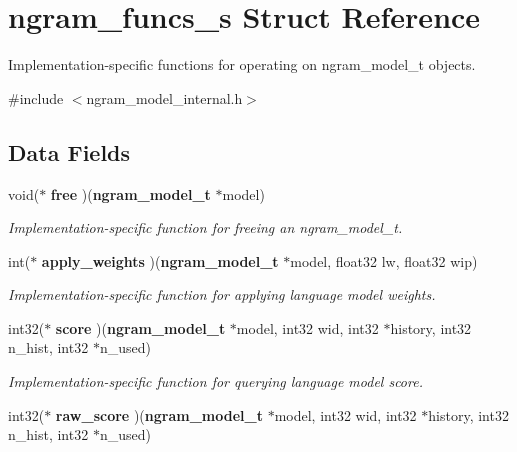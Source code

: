 \section{ngram\-\_\-funcs\-\_\-s Struct Reference}
\label{structngram__funcs__s}


Implementation-\/specific functions for operating on ngram\-\_\-model\-\_\-t objects.  




{\ttfamily \#include $<$ngram\-\_\-model\-\_\-internal.\-h$>$}

\subsection*{Data Fields}
\begin{DoxyCompactItemize}
\item 
void($\ast$ {\bf free} )({\bf ngram\-\_\-model\-\_\-t} $\ast$model)\label{structngram__funcs__s_a4211130880131f38e16022985816952f}

\begin{DoxyCompactList}\small\item\em Implementation-\/specific function for freeing an ngram\-\_\-model\-\_\-t. \end{DoxyCompactList}\item 
int($\ast$ {\bf apply\-\_\-weights} )({\bf ngram\-\_\-model\-\_\-t} $\ast$model, float32 lw, float32 wip)\label{structngram__funcs__s_a20d608dd48e1e612c102e418bc7a9fd7}

\begin{DoxyCompactList}\small\item\em Implementation-\/specific function for applying language model weights. \end{DoxyCompactList}\item 
int32($\ast$ {\bf score} )({\bf ngram\-\_\-model\-\_\-t} $\ast$model, int32 wid, int32 $\ast$history, int32 n\-\_\-hist, int32 $\ast$n\-\_\-used)\label{structngram__funcs__s_a81b0c7948179c2572fb274401b82278e}

\begin{DoxyCompactList}\small\item\em Implementation-\/specific function for querying language model score. \end{DoxyCompactList}\item 
int32($\ast$ {\bf raw\-\_\-score} )({\bf ngram\-\_\-model\-\_\-t} $\ast$model, int32 wid, int32 $\ast$history, int32 n\-\_\-hist, int32 $\ast$n\-\_\-used)\label{structngram__funcs__s_a2a64c66491914168bd830237cc93b16c}


\end{DoxyCompactItemize}
